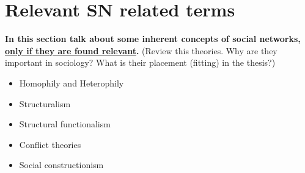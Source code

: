 \section{Relevant SN related terms}
\textbf{In this section talk about some inherent concepts of social networks, \underline{only if they are found relevant}.}
(Review this theories. Why are they important in sociology? What is their placement (fitting) in the thesis?)
\begin{itemize}
\item Homophily and Heterophily
\item Structuralism
\item Structural functionalism
\item Conflict theories
\item Social constructionism
\end{itemize}